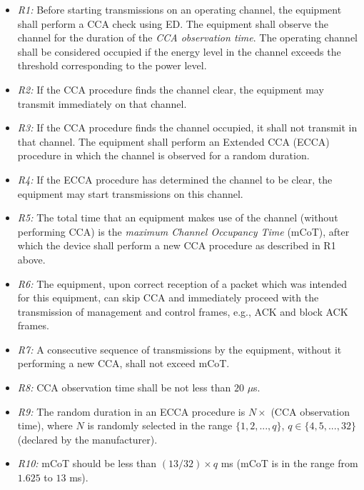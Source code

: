 \begin{itemize}
	
	\item
	\textit{R1:} Before starting transmissions on an operating channel, the equipment shall perform a CCA check using ED. The equipment shall observe the channel for the duration of the \textit{CCA observation time}. The operating channel shall be considered occupied if the energy level in the channel exceeds the threshold corresponding to the power level.
	
	\item
	\textit{R2:}
	If the CCA procedure finds the channel clear, the equipment may transmit immediately on that channel.
	
	\item
	\textit{R3:}
	If the CCA procedure finds the channel occupied, it shall not transmit in that channel. The equipment shall perform an Extended CCA (ECCA) procedure in which the channel is observed for a random duration.
	
	\item
	\textit{R4:}
	If the ECCA procedure has determined the channel to be clear, the equipment may start transmissions on this channel.
	
	\item
	\textit{R5:}
	The total time that an equipment makes use of the channel (without performing CCA) is the \textit{maximum Channel Occupancy Time} (mCoT), after which the device shall perform a new CCA procedure as described in R1 above.
	
	\item
	\textit{R6:}
	The equipment, upon correct reception of a packet which was intended for this equipment, can skip CCA and immediately proceed with the transmission of management and control frames, e.g., ACK and block ACK frames.
	
	\item
	\textit{R7:}
	A consecutive sequence of transmissions by the equipment, without it performing a new CCA, shall not exceed mCoT.
	
	\item
	\textit{R8:}
	CCA observation time shall be not less than $20$ $\mu$s.
	
	\item
	\textit{R9:}
	The random duration in an ECCA procedure is $N \times$ (CCA observation time), where $N$ is randomly selected in the range $\{1,2,...,q\}$, $q \in \{4,5,...,32\}$ (declared by the manufacturer).
	
	\item
	\textit{R10:}
	mCoT should be less than $(13/32)\times q$ ms (mCoT is in the range from $1.625$ to $13$ ms).
	
\end{itemize}


